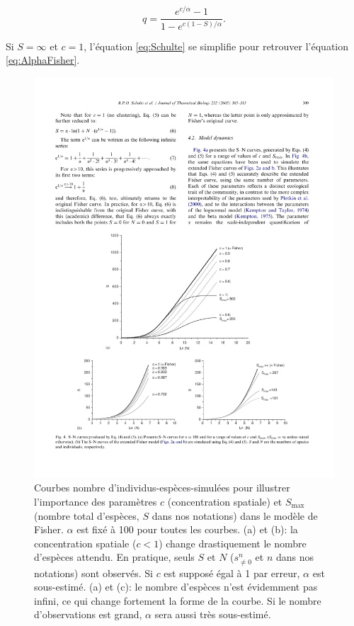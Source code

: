 \documentclass[
  11pt,
  french,
  a4paper,
  extrafontsizes,onecolumn,openright
  ]{memoir}
\begin{document}
\begin{equation}
  \label{eq:Schulteq}
  q =\frac{e^{c/\alpha}-1}{1-e^{c\left(1-S\right)/\alpha}}.
\end{equation}

Si \(S = \infty\) et \(c = 1\), l'équation \eqref{eq:Schulte} se simplifie pour retrouver l'équation \eqref{eq:AlphaFisher}.



\scriptsize

\begin{figure}

{\centering \includegraphics[width=0.8\linewidth]{images/Schulte2005b} 

}

\caption{Courbes nombre d'individus-espèces-simulées pour illustrer l'importance des paramètres \(c\) (concentration spatiale) et \(S_{\max}\) (nombre total d'espèces, \(S\) dans nos notations) dans le modèle de Fisher. \(\alpha\) est fixé à 100 pour toutes les courbes. (a) et (b): la concentration spatiale (\(c<1\)) change drastiquement le nombre d'espèces attendu. En pratique, seuls \(S\) et \(N\) (\(s^{n}_{\ne 0}\) et \(n\) dans nos notations) sont observés. Si \(c\) est supposé égal à 1 par erreur, \(\alpha\) est sous-estimé. (a) et (c): le nombre d'espèces n'est évidemment pas infini, ce qui change fortement la forme de la courbe. Si le nombre d'observations est grand, \(\alpha\) sera aussi très sous-estimé.}\label{fig:Schulte2005b}
\end{figure}
\end{document}

